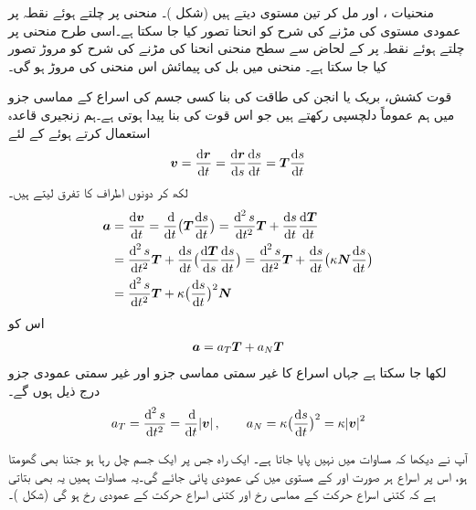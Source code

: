 منحنیات ،  اور   مل کر تین  مستوی دیتے ہیں (شکل )۔ منحنی پر چلتے ہوئے   نقطہ  پر عمودی مستوی کی  مڑنے کی شرح  کو   انحنا   تصور کیا جا سکتا ہے۔اسی طرح  منحنی پر چلتے ہوئے نقطہ  پر  کے لحاض سے    سطح منحنی انحنا کی مڑنے کی شرح کو مروڑ  تصور کیا جا سکتا ہے۔  منحنی میں بل کی  پیمائش اس منحنی کی  مروڑ ہو گی۔


قوت کشش، بریک  یا انجن کی طاقت کی بنا کسی جسم کی اسراع کے مماسی جزو میں ہم عموماً دلچسپی رکھتے ہیں جو اس قوت کی بنا پیدا ہوتی ہے۔ہم زنجیری قاعدہ استعمال کرتے ہوئے  کے لئے
\begin{align*}
\kvec{v}=\frac{\dif\kvec{r}}{\dif t}=\frac{\dif\kvec{r}}{\dif s}\frac{\dif s}{\dif t}=\kvec{T}\frac{\dif s}{\dif t}
\end{align*}
لکھ   کر دونوں اطراف کا تفرق  لیتے ہیں۔
\begin{align*}
\kvec{a}&=\frac{\dif\kvec{v}}{\dif t}=\frac{\dif}{\dif t}\big(\kvec{T}\frac{\dif s}{\dif t}\big)=\frac{\dif^{\,2}s}{\dif t^2}\kvec{T}+\frac{\dif s}{\dif t}\frac{\dif \kvec{T}}{\dif t}\\
&=\frac{\dif^{\,2}s}{\dif t^2}\kvec{T}+\frac{\dif s}{\dif t}\big(\frac{\dif\kvec{T}}{\dif s}\frac{\dif s}{\dif t}\big)=\frac{\dif^{\,2}s}{\dif t^2}\kvec{T}+\frac{\dif s}{\dif t}\big(\kappa \kvec{N}\frac{\dif s}{\dif t}\big)\\
&=\frac{\dif^{\,2}s}{\dif t^2}\kvec{T}+\kappa\big(\frac{\dif s}{\dif t}\big)^2\kvec{N}
\end{align*}
اس کو
\begin{align}\label{مساوات_سمتی_تفاعل_اسراع_الف}
{\ensuremath{{\boldsymbol{a}}}}=a_T{{\boldsymbol{T}}}+a_N{{\boldsymbol{T}}}
\end{align}
لکھا جا سکتا ہے جہاں اسراع کا غیر سمتی مماسی جزو   اور غیر سمتی عمودی جزو   درج ذیل ہوں گے۔
\begin{align}\label{مساوات_سمتی_تفاعل_اسراع_ب}
a_T=\frac{\dif^{\,2}s}{\dif t^2}=\frac{\dif}{\dif t}\abs{\kvec{v}},\quad\quad  a_N=\kappa\big(\frac{\dif s}{\dif t}\big)^2=\kappa\abs{\kvec{v}}^2
\end{align}

آپ نے دیکھا کہ مساوات  میں  نہیں پایا جاتا ہے۔ ایک راہ جس پر ایک جسم چل رہا ہو جتنا بھی گھومتا ہو، اس پر اسراع ہر صورت   اور 
  کے مستوی میں  کی عمودی  پائی جائے گی۔یہ مساوات ہمیں یہ بھی بتاتی ہے کہ کتنی اسراع حرکت کے مماسی رخ   اور کتنی اسراع حرکت کے عمودی رخ  ہو گی  (شکل )۔ 

